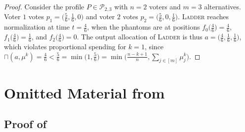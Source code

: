 \documentclass[11pt]{article}
\newcommand{\overlap}[2]{\sqcap(#1, #2)}
\newcommand{\Ladder}{\textsc{Ladder} }
\begin{document}
\begin{proof}
    Consider the profile $P \in \mathcal{P}_{2,3}$ with $n = 2$ voters and $m = 3$ alternatives.
    Voter $1$ votes $p_1 = \big(\frac{5}{6}, \frac{1}{6}, 0\big)$ and voter $2$ votes $p_2 = \big(\frac{5}{6}, 0, \frac{1}{6}\big)$. \Ladder reaches normalization at time $t = \frac{4}{6}$, when the phantoms are at positions $f_0\big(\frac{4}{6}\big) = \frac{4}{6}$, $f_1\big(\frac{4}{6}\big) = \frac{1}{6}$, and $f_2\big(\frac{4}{6}\big) = 0$. The output allocation of \Ladder is thus $a = \big(\frac{4}{6}, \frac{1}{6}, \frac{1}{6}\big)$, which violates proportional spending for $k = 1$, since $\overlap{a}{\mu^k} = \frac{4}{6} < \frac{5}{6} = \min\big(1, \frac{5}{6}\big) = \min\big(\frac{n-k+1}{n}, \sum_{j \in [m]} \mu^k_j\big)$. 
\end{proof}




\section{Omitted Material from } 

\subsection{Proof of }\label{app:lemPhantomDomination}

\lemPhantomDomination*
\end{document}
